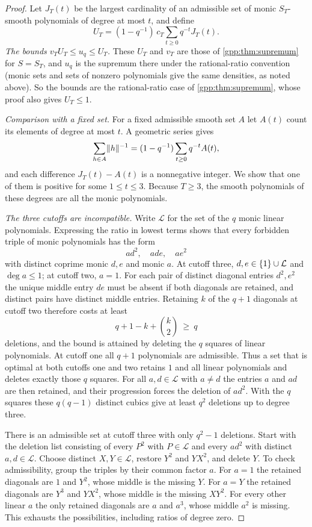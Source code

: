 \begin{proof}
Let $J_T(t)$ be the largest cardinality of an admissible set of monic $S_T$-smooth
polynomials of degree at most $t$, and define
\[
 U_T=(1-q^{-1})\,c_T\sum_{t\ge0}q^{-t}J_T(t).
\]
\emph{The bounds $v_TU_T\le u_q\le U_T$.} These $U_T$ and $v_T$ are those of
\cref{gpp:thm:supremum} for $S=S_T$, and $u_q$ is the supremum there under the
rational-ratio convention (monic sets and sets of nonzero polynomials give the same
densities, as noted above). So the bounds are the rational-ratio case of
\cref{gpp:thm:supremum}, whose proof also gives $U_T\le1$.

\emph{Comparison with a fixed set.} For a fixed admissible smooth set $A$ let $A(t)$ count
its elements of degree at most $t$. A geometric series gives
\[
 \sum_{h\in A}\lVert h\rVert^{-1}=(1-q^{-1})\sum_{t\ge0}q^{-t}A(t),
\]
and each difference $J_T(t)-A(t)$ is a nonnegative integer. We show that one of them is
positive for some $1\le t\le3$. Because $T\ge3$, the smooth polynomials of these degrees are
all the monic polynomials.

\emph{The three cutoffs are incompatible.} Write $\mathcal L$ for the set of the $q$ monic
linear polynomials. Expressing the ratio in lowest terms shows that every forbidden triple
of monic polynomials has the form
\[
 ad^2,\quad ade,\quad ae^2
\]
with distinct coprime monic $d,e$ and monic $a$. At cutoff three, $d,e\in\{1\}\cup\mathcal L$
and $\deg a\le1$; at cutoff two, $a=1$. For each pair of distinct diagonal entries $d^2,e^2$
the unique middle entry $de$ must be absent if both diagonals are retained, and distinct
pairs have distinct middle entries. Retaining $k$ of the $q+1$ diagonals at cutoff two
therefore costs at least
\[
 q+1-k+\binom k2\ \ge\ q
\]
deletions, and the bound is attained by deleting the $q$ squares of linear polynomials. At
cutoff one all $q+1$ polynomials are admissible. Thus a set that is optimal at both cutoffs
one and two retains $1$ and all linear polynomials and deletes exactly those $q$ squares. For
all $a,d\in\mathcal L$ with $a\ne d$ the entries $a$ and $ad$ are then retained, and their
progression forces the deletion of $ad^2$. With the $q$ squares these $q(q-1)$ distinct
cubics give at least $q^2$ deletions up to degree three.

There is an admissible set at cutoff three with only $q^2-1$ deletions. Start with the
deletion list consisting of every $P^2$ with $P\in\mathcal L$ and every $ad^2$ with distinct
$a,d\in\mathcal L$. Choose distinct $X,Y\in\mathcal L$, restore $Y^2$ and $YX^2$, and delete
$Y$. To check admissibility, group the triples by their common factor $a$. For $a=1$ the
retained diagonals are $1$ and $Y^2$, whose middle is the missing $Y$. For $a=Y$ the retained
diagonals are $Y^3$ and $YX^2$, whose middle is the missing $XY^2$. For every other linear
$a$ the only retained diagonals are $a$ and $a^3$, whose middle $a^2$ is missing. This
exhausts the possibilities, including ratios of degree zero.


\end{proof}
